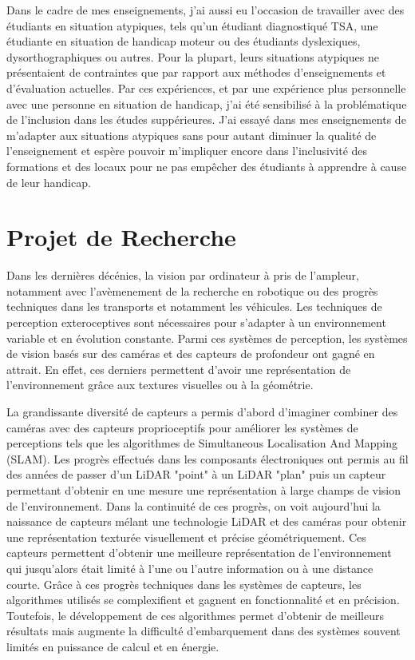 \documentclass[11pt,a4paper,sans]{moderncv}         %
\begin{document}
Dans le cadre de mes enseignements, j'ai aussi eu l'occasion de travailler avec des étudiants en situation atypiques, tels qu'un étudiant diagnostiqué TSA, une étudiante en situation de handicap moteur ou des étudiants dyslexiques, dysorthographiques ou autres. Pour la plupart, leurs situations atypiques ne présentaient de contraintes que par rapport aux méthodes d'enseignements et d'évaluation actuelles. Par ces expériences, et par une expérience plus personnelle avec une personne en situation de handicap, j'ai été sensibilisé à la problématique de l'inclusion dans les études suppérieures. J'ai essayé dans mes enseignements de m'adapter aux situations atypiques sans pour autant diminuer la qualité de l'enseignement et espère pouvoir m'impliquer encore dans l'inclusivité des formations et des locaux pour ne pas empêcher des étudiants à apprendre à cause de leur handicap.

\section{Projet de Recherche}

Dans les dernières décénies, la vision par ordinateur à pris de l'ampleur, notamment avec l'avèmenement de la recherche en robotique ou des progrès techniques dans les transports et notamment les véhicules. Les techniques de perception exteroceptives sont nécessaires pour s'adapter à un environnement variable et en évolution constante.
Parmi ces systèmes de perception, les systèmes de vision basés sur des caméras et des capteurs de profondeur ont gagné en attrait. En effet, ces derniers permettent d'avoir une représentation de l'environnement grâce aux textures visuelles ou à la géométrie.

La grandissante diversité de capteurs a permis d'abord d'imaginer combiner des caméras avec des capteurs proprioceptifs pour améliorer les systèmes de perceptions tels que les algorithmes de Simultaneous Localisation And Mapping (SLAM). Les progrès effectués dans les composants électroniques ont permis au fil des années de passer d'un LiDAR "point" à un LiDAR "plan" puis un capteur permettant d'obtenir en une mesure une représentation à large champs de vision de l'environnement. Dans la continuité de ces progrès, on voit aujourd'hui la naissance de capteurs mélant une technologie LiDAR et des caméras pour obtenir une représentation texturée visuellement et précise géométriquement. Ces capteurs permettent d'obtenir une meilleure représentation de l'environnement qui jusqu'alors était limité à l'une ou l'autre information ou à une distance courte. Grâce à ces progrès techniques dans les systèmes de capteurs, les algorithmes utilisés se complexifient et gagnent en fonctionnalité et en précision. Toutefois, le développement de ces algorithmes permet d'obtenir de meilleurs résultats mais augmente la difficulté d'embarquement dans des systèmes souvent limités en puissance de calcul et en énergie.
\end{document}

